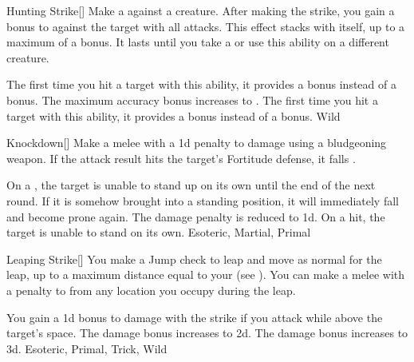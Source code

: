 \lowercase{\hypertarget{maneuver:Hunting Strike}{}}\label{maneuver:Hunting Strike}
\hypertarget{maneuver:Hunting Strike}{}
\begin{freeability}[Rank 1]{Hunting Strike}[]
Make a  against a creature.
After making the strike, you gain a  bonus to  against the target with all attacks.
This effect stacks with itself, up to a maximum of a  bonus.
It lasts until you take a  or use this ability on a different creature.

\rankline
{} The first time you hit a target with this ability, it provides a  bonus instead of a  bonus.
 The maximum accuracy bonus increases to .
 The first time you hit a target with this ability, it provides a  bonus instead of a  bonus.
 Wild
\end{freeability}
\vspace{0.25em}



\lowercase{\hypertarget{maneuver:Knockdown}{}}\label{maneuver:Knockdown}
\hypertarget{maneuver:Knockdown}{}
\begin{freeability}[Rank 1]{Knockdown}[]
Make a melee  with a \minus1d penalty to damage using a bludgeoning weapon.
If the attack result hits the target's Fortitude defense,
it falls .

\rankline
{} On a , the target is unable to stand up on its own until the end of the next round.
If it is somehow brought into a standing position, it will immediately fall and become prone again.
 The damage penalty is reduced to \minus1d.
 On a hit, the target is unable to stand on its own.
 Esoteric, Martial, Primal
\end{freeability}
\vspace{0.25em}



\lowercase{\hypertarget{maneuver:Leaping Strike}{}}\label{maneuver:Leaping Strike}
\hypertarget{maneuver:Leaping Strike}{}
\begin{freeability}[Rank 1]{Leaping Strike}[]
You make a Jump check to leap and move as normal for the leap, up to a maximum distance equal to your  (see ).
You can make a melee  with a  penalty to  from any location you occupy during the leap.

\rankline
{} You gain a \plus1d bonus to damage with the strike if you attack while above the target's space.
 The damage bonus increases to \plus2d.
 The damage bonus increases to \plus3d.
 Esoteric, Primal, Trick, Wild
\end{freeability}
\vspace{0.25em}




